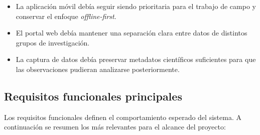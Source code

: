 \begin{itemize}
  \item La aplicación móvil debía seguir siendo prioritaria para el trabajo de campo
    y conservar el enfoque \textit{offline-first}.
  \item El portal web debía mantener una separación clara entre datos de distintos
    grupos de investigación.
  \item La captura de datos debía preservar metadatos científicos suficientes para
    que las observaciones pudieran analizarse posteriormente.
\end{itemize}

\subsection{Requisitos funcionales principales}

Los requisitos funcionales definen el comportamiento esperado del sistema. A
continuación se resumen los más relevantes para el alcance del proyecto:

